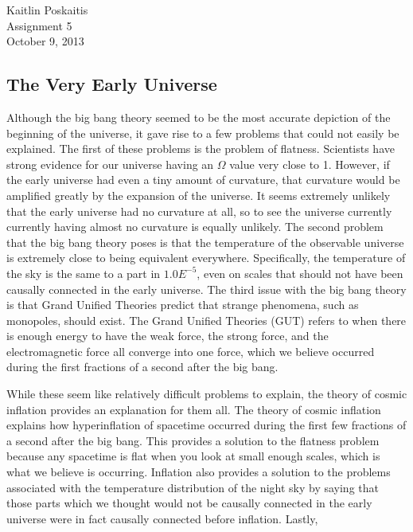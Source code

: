 \documentclass[12pt]{article}
\begin{document}
\noindent Kaitlin Poskaitis\\
Assignment 5\\
October 9, 2013
\begin{center}
    \section*{\bf The Very Early Universe}
\end{center}


Although the big bang theory seemed to be the most accurate depiction of the
beginning of the universe, it gave rise to a few problems that could not easily
be explained.  The first of these problems is the problem of flatness.
Scientists have strong evidence for our universe having an $\Omega$ value very
close to 1.  However, if the early universe had even a tiny amount of curvature,
that curvature would be amplified greatly by the expansion of the universe. It
seems extremely unlikely that the early universe had no curvature at all, so to
see the universe currently currently having almost no curvature is equally
unlikely.  The second problem that the big bang theory poses is that the
temperature of the observable universe is extremely close to being equivalent
everywhere.  Specifically, the temperature of the sky is the same to a part in
$1.0E^{-5}$, even on scales that should not have been causally connected in the
early universe.  The third issue with the big bang theory is that Grand Unified
Theories
predict that strange phenomena, such as monopoles, should exist.  The Grand
Unified Theories (GUT) refers to when there is enough energy to have the weak
force, the strong force, and the electromagnetic force all converge into one
force, which we believe occurred during the first fractions of a second after the
big bang.

While these seem like relatively difficult problems to explain, the theory of
cosmic inflation provides an explanation for them all.  The theory of cosmic
inflation explains how hyperinflation of spacetime occurred during the first few
fractions of a second after the big bang.  This provides a solution to the
flatness problem because any spacetime is flat when you look at small enough
scales, which is what we believe is occurring.  Inflation also provides a
solution to the problems associated with the temperature distribution of the
night sky by saying that those parts which we thought would not be causally
connected in the early universe were in fact causally connected before
inflation.  Lastly, 
\end{document}
